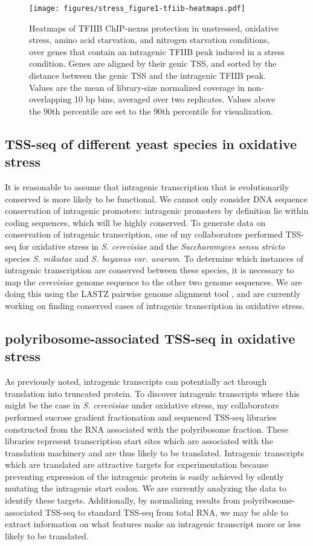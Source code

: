 \documentclass[9pt, letterpaper]{article}
\begin{document}
\begin{figure}[H]
\centering
\texttt{[image: figures/stress\_figure1-tfiib-heatmaps.pdf]}
\caption{Heatmaps of TFIIB ChIP-nexus protection in unstressed, oxidative stress, amino acid starvation, and nitrogen starvation conditions, over genes that contain an intragenic TFIIB peak induced in a stress condition. Genes are aligned by their genic TSS, and sorted by the distance between the genic TSS and the intragenic TFIIB peak. Values are the mean of library-size normalized coverage in non-overlapping 10 bp bins, averaged over two replicates. Values above the 90th percentile are set to the 90th percentile for visualization.}
\label{fig:stress_tfiib-heatmaps}
\end{figure}

\subsection{TSS-seq of different yeast species in oxidative stress}

It is reasonable to assume that intragenic transcription that is evolutionarily conserved is more likely to be functional. We cannot only consider DNA sequence conservation of intragenic promoters: intragenic promoters by definition lie within coding sequences, which will be highly conserved. To generate data on conservation of intragenic transcription, one of my collaborators performed TSS-seq for oxidative stress in \textit{S. cerevisiae} and the \textit{Saccharomyces sensu stricto} species \textit{S. mikatae} and \textit{S. bayanus var. uvarum}. To determine which instances of intragenic transcription are conserved between these species, it is necessary to map the \textit{cerevisiae} genome sequence to the other two genome sequences. We are doing this using the LASTZ pairwise genome alignment tool \cite{harris2007}, and are currently working on finding conserved cases of intragenic transcription in oxidative stress.

\subsection{polyribosome-associated TSS-seq in oxidative stress}

As previously noted, intragenic transcripts can potentially act through translation into truncated protein. To discover intragenic transcripts where this might be the case in \textit{S. cerevisiae} under oxidative stress, my collaborators performed sucrose gradient fractionation and sequenced TSS-seq libraries constructed from the RNA associated with the polyribosome fraction. These libraries represent transcription start sites which are associated with the translation machinery and are thus likely to be translated. Intragenic transcripts which are translated are attractive targets for experimentation because preventing expression of the intragenic protein is easily achieved by silently mutating the intragenic start codon. We are currently analyzing the data to identify these targets. Additionally, by normalizing results from polyribosome-associated TSS-seq to standard TSS-seq from total RNA, we may be able to extract information on what features make an intragenic transcript more or less likely to be translated.
\end{document}
